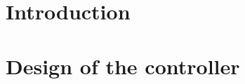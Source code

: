 



\setcounter{page}{2}
\tableofcontents

\hypersetup{allcolors = link}
\chapter{Introduction}


\chapter{Design of the controller}

%


